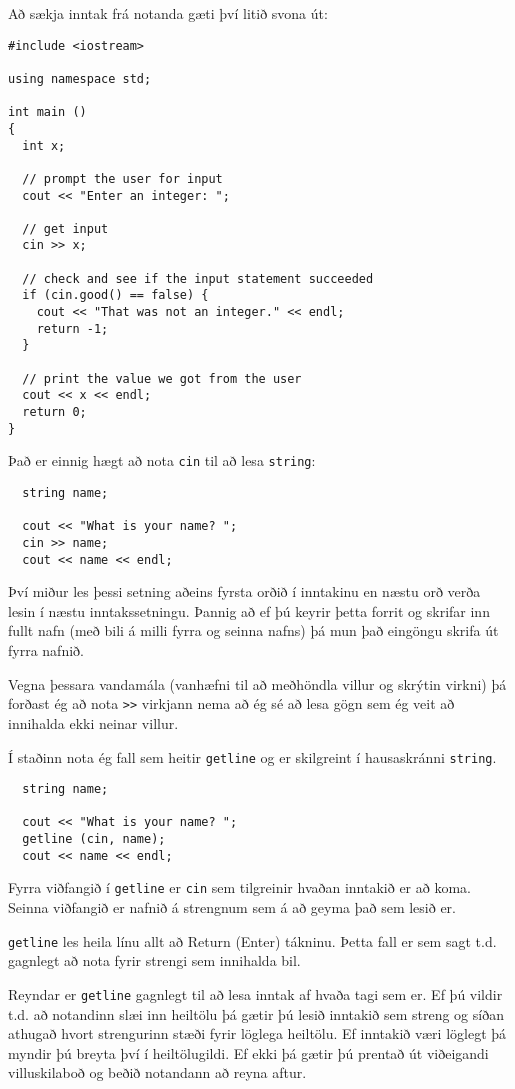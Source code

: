 Að sækja inntak frá notanda gæti því litið svona út:

\begin{verbatim}
#include <iostream>

using namespace std;

int main ()
{
  int x;

  // prompt the user for input
  cout << "Enter an integer: ";

  // get input
  cin >> x;

  // check and see if the input statement succeeded
  if (cin.good() == false) {
    cout << "That was not an integer." << endl;
    return -1;
  }

  // print the value we got from the user
  cout << x << endl;
  return 0;
}
\end{verbatim}
%
Það er einnig hægt að nota {\tt cin} til að lesa {\tt string}:

\begin{verbatim}
  string name;

  cout << "What is your name? ";
  cin >> name;
  cout << name << endl;
\end{verbatim}
%
Því miður les þessi setning aðeins fyrsta orðið í inntakinu en næstu orð verða lesin í næstu inntakssetningu.
Þannig að ef þú keyrir þetta forrit og skrifar inn fullt nafn (með bili á milli fyrra og seinna nafns) þá mun það eingöngu skrifa út fyrra nafnið.

Vegna þessara vandamála (vanhæfni til að meðhöndla villur og skrýtin virkni) þá forðast ég að nota {\tt >>} virkjann
nema að ég sé að lesa gögn sem ég veit að innihalda ekki neinar villur.

Í staðinn nota ég fall sem heitir {\tt getline} og er skilgreint í hausaskránni {\tt string}.

\begin{verbatim}
  string name;

  cout << "What is your name? ";
  getline (cin, name);
  cout << name << endl;
\end{verbatim}
%
Fyrra viðfangið í {\tt getline} er {\tt cin} sem tilgreinir hvaðan inntakið er að koma.
Seinna viðfangið er nafnið á strengnum sem á að geyma það sem lesið er.

{\tt getline} les heila línu allt að Return (Enter) tákninu.
Þetta fall er sem sagt t.d. gagnlegt að nota fyrir strengi sem innihalda bil.

Reyndar er {\tt getline} gagnlegt til að lesa inntak af hvaða tagi sem er.
Ef þú vildir t.d. að notandinn slæi inn heiltölu þá gætir þú lesið inntakið sem streng og síðan athugað hvort strengurinn stæði fyrir löglega heiltölu.
Ef inntakið væri löglegt þá myndir þú breyta því í heiltölugildi.
Ef ekki þá gætir þú prentað út viðeigandi villuskilaboð og beðið notandann að reyna aftur.

